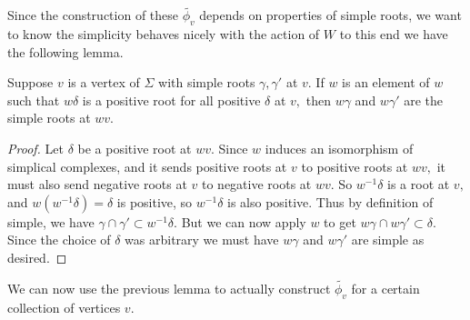 \documentclass[class=book, crop=false,12 pt]{standalone}
\begin{document}
Since the construction of these $\tilde{\phi_v}$ depends on properties of simple roots, we want to know the simplicity behaves nicely with the action of $W$ to this end we have the following lemma.

\begin{lemma}
	Suppose $v$ is a vertex of $\Sigma$ with simple roots $\gamma,\gamma'$ at $v.$ If $w$ is an element of $w$ such that $w\delta$ is a positive root for all positive $\delta$ at $v,$ then $w\gamma$ and $w\gamma'$ are the simple roots at $wv.$ \label{preservesimple}
\end{lemma}
\begin{proof}
	Let $\delta$ be a positive root at $wv.$ Since $w$ induces an isomorphism of simplical complexes, and it sends positive roots at $v$ to positive roots at $wv,$ it must also send negative roots at $v$ to negative roots at $wv.$ So $w^{-1}\delta$ is a root at $v,$ and $w(w^{-1}\delta)=\delta$ is positive, so $w^{-1}\delta$ is also positive. Thus by definition of simple, we have $\gamma \cap \gamma'\subset w^{-1}\delta.$ But we can now apply $w$ to get $w\gamma \cap w\gamma' \subset \delta.$ Since the choice of $\delta$ was arbitrary we must have $w\gamma$ and $w\gamma'$ are simple as desired.
\end{proof}

We can now use the previous lemma to actually construct $\tilde{\phi_v}$ for a certain collection of vertices $v.$
\end{document}
